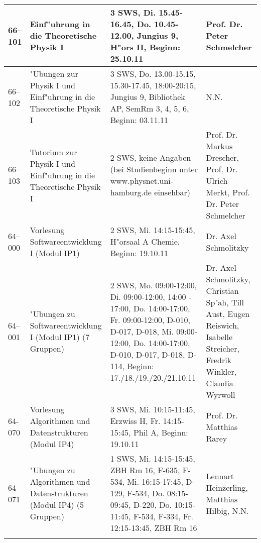 \begin{tabularx}{\textwidth}{|l|X|X|X|}
\hline 66--101 	& Einf"uhrung in die Theoretische Physik I
	              & 3 SWS, Di. 15.45-16.45, Do. 10.45-12.00, Jungius 9, H"ors II, Beginn: 25.10.11
	              & Prof. Dr. Peter Schmelcher \\
	              
\hline 66--102 	& "Ubungen zur Physik I und Einf"uhrung in die Theoretische Physik I              
								& 3 SWS, Do. 13.00-15.15, 15.30-17.45, 18:00-20:15, Jungius 9, Bibliothek AP, SemRm 3, 4, 5, 6, Beginn: 03.11.11
								& N.N. \\
								
\hline 66--103	& Tutorium zur Physik I und Einf"uhrung in die Theoretische Physik I
	              & 2 SWS, keine Angaben (bei Studienbeginn unter www.physnet.uni-hamburg.de einsehbar)
	              & Prof. Dr. Markus Drescher, Prof. Dr. Ulrich Merkt, Prof. Dr. Peter Schmelcher \\
	              
\hhline{|=|=|=|=|} 64--000 & Vorlesung Softwareentwicklung I (Modul IP1)
                           & 2 SWS, Mi. 14:15-15:45, H"orsaal A Chemie, Beginn: 19.10.11
                           & Dr. Axel Schmolitzky \\
                           
\hline 64--001 & "Ubungen zu Softwareentwicklung I (Modul IP1) (7 Gruppen)
               & 2 SWS, Mo. 09:00-12:00, Di. 09:00-12:00, 14:00 - 17:00, Do. 14:00-17:00, Fr. 09:00-12:00, D-010, D-017, D-018, Mi. 09:00-12:00, Do. 14:00-17:00, D-010, D-017, D-018, D-114, Beginn: 17./18./19./20./21.10.11
               & Dr. Axel Schmolitzky, Christian Sp"ah, Till Aust, Eugen Reiswich, Isabelle Streicher, Fredrik Winkler, Claudia Wyrwoll \\
               
\hline 64-070 & Vorlesung Algorithmen und Datenstrukturen (Modul IP4)
              & 3 SWS, Mi. 10:15-11:45, Erzwiss H, Fr. 14:15-15:45, Phil A, Beginn: 19.10.11
              & Prof. Dr. Matthias Rarey \\
\hline 64-071 & "Ubungen zu Algorithmen und Datenstrukturen (Modul IP4) (5 Gruppen)
              & 1 SWS, Mi. 14:15-15:45, ZBH Rm 16, F-635, F-534, Mi. 16:15-17:45, D-129, F-534, Do. 08:15-09:45, D-220, Do. 10:15-11:45, F-534, F-334, Fr. 12:15-13:45, ZBH Rm 16
              & Lennart Heinzerling, Matthias Hilbig, N.N. \\
              
%
              &&&\\
\hline
\end{tabularx}

